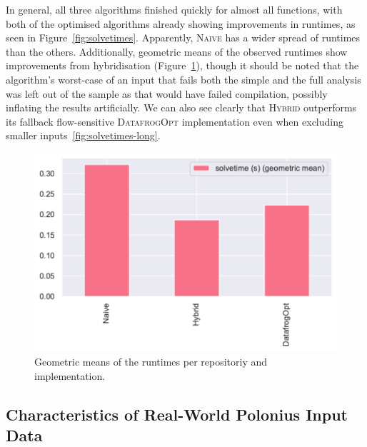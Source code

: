 \documentclass[11pt,a4paper,twoside,openany]{report}
\begin{document}
In general, all three algorithms finished quickly for almost all functions, with
both of the optimised algorithms already showing improvements in runtimes, as
seen in Figure~\ref{fig:solvetimes}. Apparently, \textsc{Naive} has a wider
spread of runtimes than the others. Additionally, geometric means of the
observed runtimes show improvements from hybridisation
(Figure~\ref{fig:solvetimes-gmean-repo}), though it should be noted that the
algorithm's worst-case of an input that fails both the simple and the full
analysis was left out of the sample as that would have failed compilation,
possibly inflating the results artificially. We can also see clearly that
\textsc{Hybrid} outperforms its fallback flow-sensitive \textsc{DatafrogOpt}
implementation even when excluding smaller inputs~\ref{fig:solvetimes-long}.

\begin{figure}
  \includegraphics[width=0.5\linewidth]{Graphs/solvetimes_repo_gmean.pdf}
  \caption[Geometric Means of Runtimes Per Repository]{Geometric means of the
    runtimes per repositoriy and implementation.}
  \label{fig:solvetimes-gmean-repo}
\end{figure}


\subsection{Characteristics of Real-World Polonius Input
  Data}\label{sec:inputs:inputs}
\end{document}
